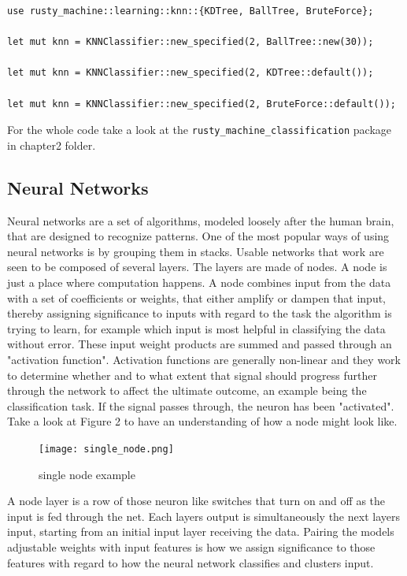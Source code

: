 \documentclass{book}
\begin{document}
\begin{lstlisting}[caption={chapter2\\/rusty\_machine\_classification\\/src\\/main\\.rs}]
use rusty_machine::learning::knn::{KDTree, BallTree, BruteForce};

let mut knn = KNNClassifier::new_specified(2, BallTree::new(30));

let mut knn = KNNClassifier::new_specified(2, KDTree::default());

let mut knn = KNNClassifier::new_specified(2, BruteForce::default());
\end{lstlisting}

For the whole code take a look at the \lstinline{rusty_machine_classification} package in chapter2 folder.
\label{sub:k_nearest_neighbors}

\subsection{Neural Networks}%

Neural networks are a set of algorithms, modeled loosely after the human brain, that are designed to recognize patterns. One of the most popular ways of using neural networks is by grouping them in stacks. Usable networks that work are seen to be composed of several layers. The layers are made of nodes. A node is just a place where computation happens. A node combines input from the data with a set of coefficients or weights, that either amplify or dampen that input, thereby assigning significance to inputs with regard to the task the algorithm is trying to learn, for example which input is most helpful in classifying the data without error. These input weight products are summed and passed through an "activation function". Activation functions are generally non-linear and they work to determine whether and to what extent that signal should progress further through the network to affect the ultimate outcome, an example being the classification task. If the signal passes through, the neuron has been "activated". Take a look at Figure 2 to have an understanding of how a node might look like.

\begin{figure}
	\centering
	\texttt{[image: single\_node.png]}
	\caption{single node example}
	\label{fig:single node example}
\end{figure}

A node layer is a row of those neuron like switches that turn on and off as the input is fed through the net. Each layers output is simultaneously the next layers input, starting from an initial input layer receiving the data. Pairing the models adjustable weights with input features is how we assign significance to those features with regard to how the neural network classifies and clusters input.
\end{document}
